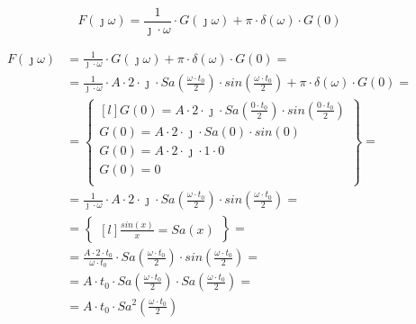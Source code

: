 \begin{task}

\begin{equation}
F(\jmath \omega) = \frac{1}{\jmath \cdot \omega} \cdot G(\jmath \omega) + \pi \cdot \delta(\omega) \cdot G(0)
\end{equation}

\begin{align*}
F(\jmath \omega)&= \frac{1}{\jmath \cdot \omega} \cdot G(\jmath \omega) + \pi \cdot \delta(\omega) \cdot G(0)=\\
&=\frac{1}{\jmath \cdot \omega} \cdot A \cdot 2 \cdot \jmath \cdot Sa\left(\frac{\omega \cdot t_{0}}{2}\right) \cdot sin\left(\frac{\omega \cdot t_{0}}{2}\right)+ \pi \cdot \delta(\omega) \cdot G(0)=\\
&=\begin{Bmatrix*}[l]
G(0)=A \cdot 2 \cdot \jmath \cdot Sa\left(\frac{0 \cdot t_{0}}{2}\right) \cdot sin\left(\frac{0 \cdot t_{0}}{2}\right)\\
G(0)=A \cdot 2 \cdot \jmath \cdot Sa(0) \cdot sin(0)\\
G(0)=A \cdot 2 \cdot \jmath \cdot 1 \cdot 0\\
G(0)=0\\
\end{Bmatrix*}=\\
&=\frac{1}{\jmath \cdot \omega} \cdot A \cdot 2 \cdot \jmath \cdot Sa\left(\frac{\omega \cdot t_{0}}{2}\right) \cdot sin\left(\frac{\omega \cdot t_{0}}{2}\right)=\\
&=\begin{Bmatrix*}[l]
\frac{sin(x)}{x}=Sa(x)
\end{Bmatrix*}=\\
&=\frac{A \cdot 2 \cdot t_{0}}{\omega \cdot t_{0}} \cdot Sa\left(\frac{\omega \cdot t_{0}}{2}\right) \cdot sin\left(\frac{\omega \cdot t_{0}}{2}\right)=\\
&=A \cdot t_{0} \cdot Sa\left(\frac{\omega \cdot t_{0}}{2}\right) \cdot Sa\left(\frac{\omega \cdot t_{0}}{2}\right)=\\
&= A \cdot t_{0} \cdot Sa^{2}(\frac{\omega \cdot t_{0}}{2})
\end{align*}


\end{task}
